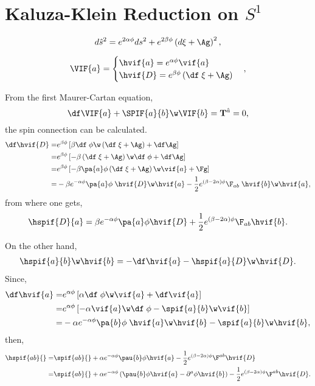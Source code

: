 
\chapter{Kaluza-Klein Reduction on $S^1$}

\nocite{PopeKK}

\begin{equation}
  d\hat{s}^2 = e^{2\alpha\phi}ds^2 + e^{2\beta\phi}\left(d\xi + \Ag\right)^2,
\end{equation}

\begin{equation}
\VIF{a} = 
\begin{cases}
  \hvif{a} = e^{\alpha\phi} \vif{a}\\
  \hvif{D} = e^{\beta\phi}\left(\df\;\xi +\Ag \right)
\end{cases},
\end{equation}

From the first Maurer-Cartan equation,
\begin{equation}
  \df\VIF{a} + \SPIF{a}{b}\w\VIF{b} = {\bf{T}}^{\hat{a}} = 0,
\end{equation}
the spin connection can be calculated.
\begin{align}
  \df\hvif{D} =& e^{\beta\phi}\left[\beta\df\;\phi\w\left(\df\;\xi +\Ag \right) + \df\Ag\right]\nonumber\\
  =& e^{\beta\phi}\left[-\beta\left(\df\;\xi +\Ag \right)\w\df\;\phi + \df\Ag\right]\nonumber\\
  =& e^{\beta\phi}\left[-\beta\pa{a}\phi\left(\df\;\xi +\Ag \right)\w\vif{a} + \Fg\right]\nonumber\\
 =& -\beta e^{-\alpha\phi}\pa{a}\phi\;\hvif{D}\w\hvif{a} -\frac{1}{2}e^{(\beta-2\alpha)\phi}\F_{a b}\;\hvif{b}\w\hvif{a},
\end{align}
from where one gets,
\begin{align}
  \hspif{D}{a} = \beta e^{-\alpha\phi}\pa{a}\phi\hvif{D} + \frac{1}{2}e^{(\beta-2\alpha)\phi}\F_{a b}\hvif{b}.
\end{align}

On the other hand,
\begin{align}
  \hspif{a}{b}\w\hvif{b} = -\df\hvif{a} - \hspif{a}{D}\w\hvif{D}.
\end{align}
Since,
\begin{align}
  \df\hvif{a} 
  =& e^{\alpha\phi}\left[\alpha\df\;\phi\w\vif{a} +  \df\vif{a}\right]\nonumber\\
  =& e^{\alpha\phi}\left[-\alpha\vif{a}\w\df\;\phi -  \spif{a}{b}\w\vif{b}\right]\nonumber\\
  =& -\alpha e^{-\alpha\phi}\pa{b}\phi\;\hvif{a}\w\hvif{b} - \spif{a}{b}\w\hvif{b},
\end{align}
then,
\begin{align}
  \hspif{ab}{} =& \spif{ab}{} + \alpha e^{-\alpha\phi}\pau{b}\phi\hvif{a} - \frac{1}{2}e^{(\beta-2\alpha)\phi}\F^{a b}\hvif{D}\nonumber\\
  =& \spif{ab}{} + \alpha e^{-\alpha\phi}\left(\pau{b}\phi\hvif{a} - \partial^{a}\phi\hvif{b}\right) - \frac{1}{2}e^{(\beta-2\alpha)\phi}\F^{a b}\hvif{D}.
\end{align}

